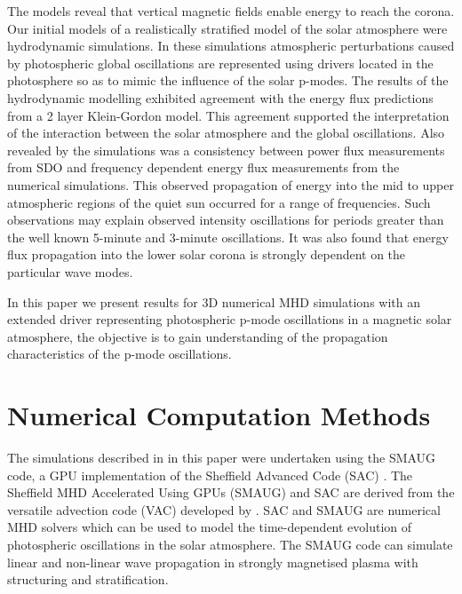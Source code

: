 \documentclass[linenumbers]{aastex63}
\begin{document}
The models reveal that vertical magnetic fields enable energy to reach the corona. Our initial models of a realistically stratified model of the solar atmosphere \citet{Griffiths2018b} were hydrodynamic simulations. In these simulations atmospheric perturbations caused by photospheric global oscillations are represented using drivers located in the photosphere so as to mimic the influence of the solar p-modes. The results of the hydrodynamic modelling exhibited agreement  with the energy flux predictions from a 2 layer Klein-Gordon model. This agreement supported the interpretation of the interaction between the solar atmosphere and the global oscillations. Also revealed by the simulations  was a consistency between power flux measurements from SDO and frequency dependent energy flux measurements from the numerical simulations. This observed propagation of energy into the mid to upper atmospheric regions of the quiet sun occurred for a range of frequencies. Such observations may explain observed intensity oscillations for periods greater than the well known 5-minute and 3-minute oscillations. It was also found that energy flux propagation into the lower solar corona is strongly dependent on the particular wave modes. 






In this paper we present results for 3D numerical MHD simulations with an extended driver representing photospheric p-mode oscillations in a magnetic solar atmosphere, the objective is to gain understanding of the propagation characteristics of the p-mode oscillations. 

\section{Numerical Computation Methods}


The simulations described in in this paper were undertaken using the SMAUG code, a GPU implementation of the Sheffield Advanced Code (SAC) \citet{Shelyag2008}. The Sheffield MHD Accelerated Using GPUs (SMAUG) \citet{Griffiths2015} and SAC  are derived from the versatile advection code (VAC) developed by \citep{Toth1996}. SAC and SMAUG are numerical MHD solvers which can be used to model the time-dependent evolution of photospheric oscillations in the solar atmosphere. The SMAUG code can simulate linear and non-linear wave propagation in strongly magnetised plasma with structuring and stratification.
\end{document}

